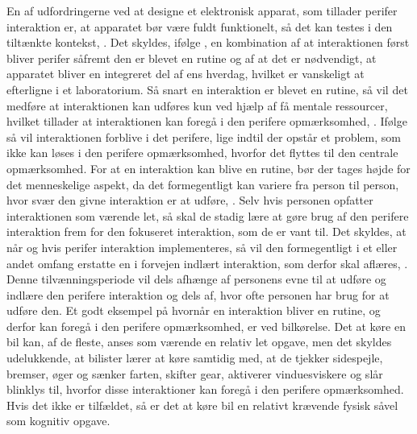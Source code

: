 En af udfordringerne ved at designe et elektronisk apparat, som tillader perifer interaktion er, at apparatet bør være fuldt funktionelt, så det kan testes i den tiltænkte kontekst, \parencite[s. 21]{PDF:EvaluatingPI}. Det skyldes, ifølge \textcite[s. 22]{PDF:EvaluatingPI}, en kombination af at interaktionen først bliver perifer såfremt den er blevet en rutine og af at det er nødvendigt, at apparatet bliver en integreret del af ens hverdag, hvilket er vanskeligt at efterligne i et laboratorium. Så snart en interaktion er blevet en rutine, så vil det medføre at interaktionen kan udføres kun ved hjælp af få mentale ressourcer, hvilket tillader at interaktionen kan foregå i den perifere opmærksomhed, \parencite[s. 2]{PDF:FacilitatingPIDesignAndEvaluation}. Ifølge \textcite[s. 14]{PDF:PIUnseenKap2} så vil interaktionen forblive i det perifere, lige indtil der opstår et problem, som ikke kan løses i den perifere opmærksomhed, hvorfor det flyttes til den centrale opmærksomhed. For at en interaktion kan blive en rutine, bør der tages højde for det menneskelige aspekt, da det formegentligt kan variere fra person til person, hvor svær den givne interaktion er at udføre, \parencite[s. 248]{PDF:PICharacteristicsAndConsiderations}. Selv hvis personen opfatter interaktionen som værende let, så skal de stadig lære at gøre brug af den perifere interaktion frem for den fokuseret interaktion, som de er vant til. Det skyldes, at når og hvis perifer interaktion implementeres, så vil den formegentligt i et eller andet omfang erstatte en i forvejen indlært interaktion, som derfor skal aflæres, \parencite[s. 248]{PDF:PICharacteristicsAndConsiderations}. Denne tilvænningsperiode vil dels afhænge af personens evne til at udføre og indlære den perifere interaktion og dels af, hvor ofte personen har brug for at udføre den. Et godt eksempel på hvornår en interaktion bliver en rutine, og derfor kan foregå i den perifere opmærksomhed, er ved bilkørelse. Det at køre en bil kan, af de fleste, anses som værende en relativ let opgave, men det skyldes udelukkende, at bilister lærer at køre samtidig med, at de tjekker sidespejle, bremser, øger og sænker farten, skifter gear, aktiverer vinduesviskere og slår blinklys til, hvorfor disse interaktioner kan foregå i den perifere opmærksomhed. Hvis det ikke er tilfældet, så er det at køre bil en relativt krævende fysisk såvel som kognitiv opgave. \blankline 
%
